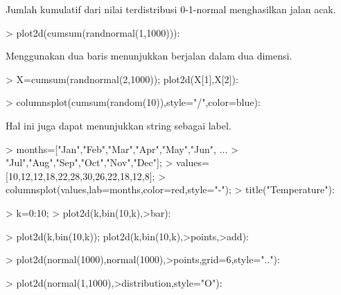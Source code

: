 \documentclass{report}
\begin{document}
\begin{eulernotebook}
\begin{eulercomment}
\begin{eulercomment}
\begin{eulercomment}
\begin{eulercomment}
\begin{eulercomment}
Jumlah kumulatif dari nilai terdistribusi 0-1-normal menghasilkan
jalan acak.
\end{eulercomment}
\begin{eulerprompt}
> plot2d(cumsum(randnormal(1,1000))):
\end{eulerprompt}
\begin{eulercomment}
Menggunakan dua baris menunjukkan berjalan dalam dua dimensi.
\end{eulercomment}
\begin{eulerprompt}
> X=cumsum(randnormal(2,1000)); plot2d(X[1],X[2]):
\end{eulerprompt}
\begin{eulerprompt}
> columnsplot(cumsum(random(10)),style="/",color=blue):
\end{eulerprompt}
\begin{eulercomment}
Hal ini juga dapat menunjukkan string sebagai label.
\end{eulercomment}
\begin{eulerprompt}
> months=["Jan","Feb","Mar","Apr","May","Jun", ...
>   "Jul","Aug","Sep","Oct","Nov","Dec"];
> values=[10,12,12,18,22,28,30,26,22,18,12,8];
> columnsplot(values,lab=months,color=red,style="-");
> title("Temperature"):
\end{eulerprompt}
\begin{eulerprompt}
> k=0:10;
> plot2d(k,bin(10,k),>bar):
\end{eulerprompt}
\begin{eulerprompt}
> plot2d(k,bin(10,k)); plot2d(k,bin(10,k),>points,>add):
\end{eulerprompt}
\begin{eulerprompt}
> plot2d(normal(1000),normal(1000),>points,grid=6,style=".."):
\end{eulerprompt}
\begin{eulerprompt}
> plot2d(normal(1,1000),>distribution,style="O"):
\end{eulerprompt}
\begin{eulerprompt}

\end{eulerprompt}
\end{eulercomment}
\end{eulercomment}
\end{eulercomment}
\end{eulercomment}
\end{eulernotebook}
\end{document}
